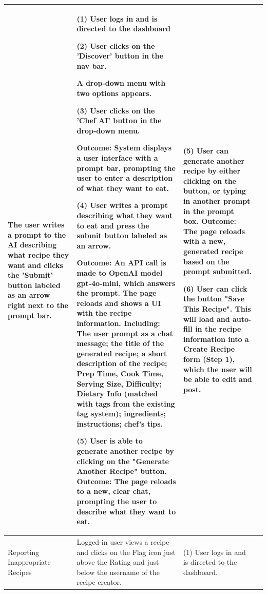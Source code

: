 \documentclass[10pt,a4paper]{article}
\begin{document}
\begin{longtable}{|p{30mm}|p{30mm}|p{40mm}|p{40mm}|}
The user writes a prompt to the AI describing what recipe they want and clicks the 'Submit' button labeled as an arrow right next to the prompt bar.
&
(1) User logs in and is directed to the dashboard

\vspace{1 mm}

(2) User clicks on the 'Discover' button in the nav bar.

A drop-down menu with two options appears.

\vspace{1 mm}

(3) User clicks on the 'Chef AI' button in the drop-down menu.

Outcome: System displays a user interface with a prompt bar, prompting the user to enter a description of what they want to eat.

\vspace{1 mm}

(4) User writes a prompt describing what they want to eat and press the submit button labeled as an arrow.

Outcome: An API call is made to OpenAI model gpt-4o-mini, which answers the prompt. The page reloads and shows a UI with the recipe information. Including: The user prompt as a chat message; the title of the generated recipe; a short description of the recipe; Prep Time, Cook Time, Serving Size, Difficulty; Dietary Info (matched with tags from the existing tag system); ingredients; instructions; chef's tips.

\vspace{1 mm}

(5) User is able to generate another recipe by clicking on the "Generate Another Recipe" button.
Outcome: The page reloads to a new, clear chat, prompting the user to describe what they want to eat.
&
(5) User can generate another recipe by either clicking on the button, or typing in another prompt in the prompt box.
Outcome: The page reloads with a new, generated recipe based on the prompt submitted.

\vspace{1 mm}
(6) User can click the button "Save This Recipe". This will load and auto-fill in the recipe information into a Create Recipe form (Step 1), which the user will be able to edit and post. \\






\hline
Reporting Inappropriate Recipes
&
Logged-in user views a recipe and clicks on the Flag icon just above the Rating and just below the username of the recipe creator.
&
(1) User logs in and is directed to the dashboard.


\end{longtable}
\end{document}
